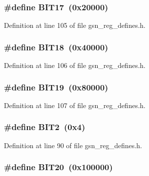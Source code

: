 \hypertarget{a00546_a27fe52b845a36280f50414ab4a00f74f}{
\subsubsection[{BIT17}]{\setlength{\rightskip}{0pt plus 5cm}\#define BIT17~(0x20000)}}
\label{a00546_a27fe52b845a36280f50414ab4a00f74f}


Definition at line 105 of file gsn\_\-reg\_\-defines.h.

\hypertarget{a00546_a56a026d146963b7d977255d9b1f682ae}{
\subsubsection[{BIT18}]{\setlength{\rightskip}{0pt plus 5cm}\#define BIT18~(0x40000)}}
\label{a00546_a56a026d146963b7d977255d9b1f682ae}


Definition at line 106 of file gsn\_\-reg\_\-defines.h.

\hypertarget{a00546_a9ce58ae33c478370e59c915b04b05381}{
\subsubsection[{BIT19}]{\setlength{\rightskip}{0pt plus 5cm}\#define BIT19~(0x80000)}}
\label{a00546_a9ce58ae33c478370e59c915b04b05381}


Definition at line 107 of file gsn\_\-reg\_\-defines.h.

\hypertarget{a00546_a9c9560bccccb00174801c728f1ed1399}{
\subsubsection[{BIT2}]{\setlength{\rightskip}{0pt plus 5cm}\#define BIT2~(0x4)}}
\label{a00546_a9c9560bccccb00174801c728f1ed1399}


Definition at line 90 of file gsn\_\-reg\_\-defines.h.

\hypertarget{a00546_a83aaba3456aa46dfefe199fe6264d8dc}{
\subsubsection[{BIT20}]{\setlength{\rightskip}{0pt plus 5cm}\#define BIT20~(0x100000)}}
\label{a00546_a83aaba3456aa46dfefe199fe6264d8dc}


